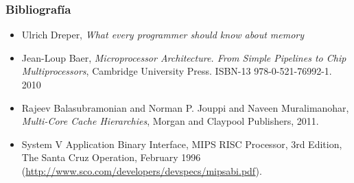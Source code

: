 \documentclass{beamer}
\begin{document}
\begin{frame}
 \frametitle{Bibliografía}
 \begin{itemize}

 \item Ulrich Dreper, \textit{What every programmer should know about memory
 }
\item Jean-Loup Baer, \textit{Microprocessor Architecture. From Simple Pipelines to Chip Multiprocessors}, Cambridge University Press. ISBN-13 978-0-521-76992-1. 2010

\item Rajeev Balasubramonian and Norman P. Jouppi and Naveen Muralimanohar, \textit{Multi-Core Cache Hierarchies}, Morgan and Claypool Publishers, 2011.

\item System V Application Binary Interface, MIPS RISC Processor, 3rd Edition, The Santa Cruz Operation, February 1996 (\url{http://www.sco.com/developers/devspecs/mipsabi.pdf}).
\end{itemize}

 \end{frame}
\end{document}

